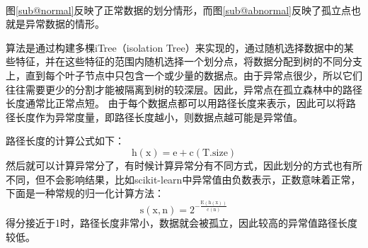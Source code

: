 \documentclass[UTF8]{article}
\begin{document}
			\\图\ref{sub@normal}反映了正常数据的划分情形，而图\ref{sub@abnormal}反映了孤立点也就是异常数据的情形。
			\par 算法是通过构建多棵iTree（isolation Tree）来实现的，通过随机选择数据中的某些特征，并在这些特征的范围内随机选择一个划分点，将数据分配到树的不同分支上，直到每个叶子节点中只包含一个或少量的数据点。由于异常点很少，所以它们往往需要更少的分割才能被隔离到树的较深层。因此，异常点在孤立森林中的路径长度通常比正常点短。
			由于每个数据点都可以用路径长度来表示，因此可以将路径长度作为异常度量，即路径长度越小，则数据点越可能是异常值。
			\par 路径长度的计算公式如下：
			$$
			\mathrm{h}\left( \mathrm{x} \right) =\mathrm{e}+\mathrm{c}\left( \mathrm{T}.\mathrm{size} \right) 
			$$
			然后就可以计算异常分了，有时候计算异常分有不同方式，因此划分的方式也有所不同，但不会影响结果，比如scikit-learn中异常值由负数表示，正数意味着正常，下面是一种常规的归一化计算方法：
			$$
			\mathrm{s}\left( \mathrm{x},\mathrm{n} \right) =2^{-\frac{\mathrm{E}\left( \mathrm{h}\left( \mathrm{x} \right) \right)}{\mathrm{c}\left( \mathrm{n} \right)}}
			$$
			得分接近于1时，路径长度非常小，数据就会被孤立，因此较高的异常值路径长度较低。
\end{document}
